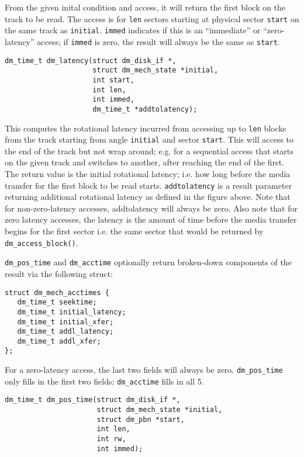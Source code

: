 From the given inital condition and access, it will return the first
block on the track to be read.  The access is for \texttt{len} sectors
starting at physical sector \texttt{start} on the same track as
\texttt{initial}.  \texttt{immed} indicates if this is an
``immediate'' or ``zero-latency'' access; if \texttt{immed} is zero,
the result will always be the same as \texttt{start}.


\begin{verbatim}
dm_time_t dm_latency(struct dm_disk_if *, 
                     struct dm_mech_state *initial,
                     int start,                    
                     int len,                      
                     int immed,                    
                     dm_time_t *addtolatency); 
\end{verbatim}

This computes the rotational latency incurred from accessing up to
\texttt{len} blocks from the track starting from angle
\texttt{initial} and sector \texttt{start}.  This will access to the
end of the track but not wrap around; e.g. for a sequential access that
starts on the given track and switches to another, after reaching the
end of the first.  The return value is the initial rotational latency;
i.e. how long before the media transfer for the first block to be read
starts.  \texttt{addtolatency} is a result parameter returning
additional rotational latency as defined in the figure above.  Note
that for non-zero-latency accesses, addtolatency will always be zero.
Also note that for zero latency accesses, the latency is the amount of
time before the media transfer begins for the first sector i.e. the
same sector that would be returned by \texttt{dm\_access\_block()}.


\texttt{dm\_pos\_time} and \texttt{dm\_acctime} optionally return
broken-down components of the result via the following struct:

\begin{verbatim}
struct dm_mech_acctimes {
   dm_time_t seektime;
   dm_time_t initial_latency;
   dm_time_t initial_xfer;
   dm_time_t addl_latency;
   dm_time_t addl_xfer;
};
\end{verbatim}

For a zero-latency access, the last two fields will always be zero.
\texttt{dm\_pos\_time} only fills in the first two fields;
\texttt{dm\_acctime} fills in all 5.

\begin{verbatim}
dm_time_t dm_pos_time(struct dm_disk_if *,
                      struct dm_mech_state *initial,
                      struct dm_pbn *start,
                      int len,
                      int rw,
                      int immed);
\end{verbatim}

